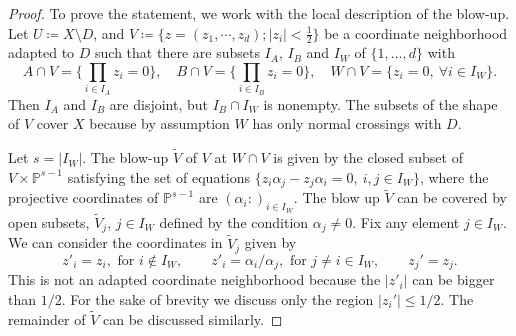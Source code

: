 \documentclass[10pt,a4paper]{amsart}
\renewcommand{\P}{\mathds{P}}
\begin{document}
\begin{proof}
  To prove the statement, we work with the local description of the
  blow-up. Let $U\coloneqq X\setminus D$, and
  $V\coloneqq \{z=(z_{1},\cdots , z_{d}); |z_{i}|< \frac{1}{2}\}$ be a
  coordinate neighborhood adapted to $D$ such that there are subsets
  $I_{A}$, $I_{B}$ and 
  $I_{W}$ of $\{1,\dots,d\}$ with 
  \begin{displaymath}
    A\cap V=\{ \prod_{i\in I_{A}} z_{i}=0\},\quad
    B\cap V=\{ \prod_{i\in I_{B}} z_{i}=0\},\quad
    W\cap V=\{ z_{i}=0,\ \forall i\in I_{W}\}.
  \end{displaymath}
  Then $I_{A}$ and $I_{B}$ are disjoint, but $I_{B}\cap I_{W}$ is
  nonempty. The subsets of the shape of $V$ cover $X$ because by
  assumption $W$ has only 
  normal crossings with $D$.

  Let $s=|I_{W}|$. The blow-up
  $\widetilde{V}$ of $V$ at $W\cap V$ is given by the closed subset of
  $V\times \P^{s-1}$ satisfying the set of equations
  $\{z_{i}\alpha_{j}-z_{j}\alpha_{i}=0, \ i,j\in I_{W}\}$,
  where the projective coordinates of $\P^{s-1}$ are
  $(\alpha_{i}\colon)_{i\in I_{W}}$. The blow up $\widetilde V$ can
  be covered by open subsets, $\widetilde V_{j}$, $j\in I_{W}$ defined by the
  condition $\alpha _{j}\not =0$. Fix any element $j\in I_{W}$. We can
  consider the coordinates in $\widetilde V_{j}$ given by
  \begin{displaymath}
    z'_{i}=z_{i}, \text{ for }i\not \in I_{W}, \qquad z'_{i}=\alpha
    _{i}/\alpha _{j}, \text{ for }j\not = i \in I_{W},\qquad z_{j}'=z_{j}.
  \end{displaymath}
  This is not an adapted coordinate neighborhood because the $|z'_{i}|$
  can be bigger than $1/2$. For the sake of brevity we discuss only
  the region $|z_{i}'|\le 1/2$. The remainder of $\widetilde V$ can be
  discussed similarly.
  

\end{proof}
\end{document}
